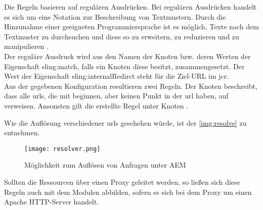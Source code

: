Die Regeln basieren auf regulären Ausdrücken. Bei regulären Ausdrücken handelt es sich um eine Notation zur Beschreibung von Textmustern. Durch die Hinzunahme einer geeigneten Programmiersprache ist es möglich, Texte nach dem Textmuster zu durchsuchen und diese so zu erweitern, zu reduzieren und zu manipulieren \cite[S. 1 f.]{Friedl2009}. \\
Der reguläre Ausdruck wird aus den Namen der Knoten bzw. deren Werten der Eigenschaft sling:match, falls ein Knoten diese besitzt, zusammengesetzt. Der Wert der Eigenschaft sling:internalRedirct steht für die Ziel-URL im \ac{jcr}. \\
Aus der gegebenen Konfiguration resultieren zwei Regeln. Der Knoten  beschreibt, dass alle \ac{url}s, die mit  beginnen, aber keinen Punkt in der \ac{url} haben, auf  verweisen. Ansonsten gilt die erstellte Regel unter Knoten .

Wie die Auflösung verschiedener \ac{url}s geschehen würde, ist der \autoref{img:resolve} zu entnehmen.

\begin{figure}[H]
	\begin{center}
		\texttt{[image: resolver.png]}
		\caption{Möglichkeit zum Auflösen von Anfragen unter AEM}
		\label{img:resolve}
	\end{center}
\end{figure}

Sollten die Ressourcen über einen Proxy geleitet werden, so ließen sich diese Regeln auch mit dem Modulen  abbilden, sofern es sich bei dem Proxy um einen Apache HTTP-Server handelt.